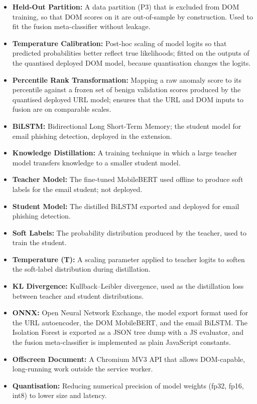 \documentclass{FastFyp}
\begin{document}
\begin{itemize}
    \item \textbf{Held-Out Partition:} A data partition (P3) that is excluded from DOM training, so that DOM scores on it are out-of-sample by construction. Used to fit the fusion meta-classifier without leakage.
    \item \textbf{Temperature Calibration:} Post-hoc scaling of model logits so that predicted probabilities better reflect true likelihoods; fitted on the outputs of the quantised deployed DOM model, because quantisation changes the logits.
    \item \textbf{Percentile Rank Transformation:} Mapping a raw anomaly score to its percentile against a frozen set of benign validation scores produced by the quantised deployed URL model; ensures that the URL and DOM inputs to fusion are on comparable scales.
    \item \textbf{BiLSTM:} Bidirectional Long Short-Term Memory; the student model for email phishing detection, deployed in the extension.
    \item \textbf{Knowledge Distillation:} A training technique in which a large teacher model transfers knowledge to a smaller student model.
    \item \textbf{Teacher Model:} The fine-tuned MobileBERT used offline to produce soft labels for the email student; not deployed.
    \item \textbf{Student Model:} The distilled BiLSTM exported and deployed for email phishing detection.
    \item \textbf{Soft Labels:} The probability distribution produced by the teacher, used to train the student.
    \item \textbf{Temperature (T):} A scaling parameter applied to teacher logits to soften the soft-label distribution during distillation.
    \item \textbf{KL Divergence:} Kullback--Leibler divergence, used as the distillation loss between teacher and student distributions.
    \item \textbf{ONNX:} Open Neural Network Exchange, the model export format used for the URL autoencoder, the DOM MobileBERT, and the email BiLSTM. The Isolation Forest is exported as a JSON tree dump with a JS evaluator, and the fusion meta-classifier is implemented as plain JavaScript constants.
    \item \textbf{Offscreen Document:} A Chromium MV3 API that allows DOM-capable, long-running work outside the service worker.
    \item \textbf{Quantisation:} Reducing numerical precision of model weights (fp32, fp16, int8) to lower size and latency.

\end{itemize}
\end{document}
